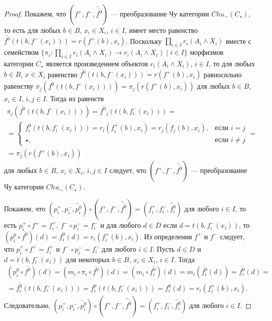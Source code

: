 \documentclass[a4paper,12pt]{article}
\begin{document}
\begin{proof}
    Покажем, что $(f^+,f^-,\widetilde{\overline{f^0}})$ --- преобразование Чу категории $Chu_\sim(C_\star)$, то есть для любых $b \in B$, $x_i \in X_i$, $i \in I$, имеет место равенство $\overline{f^0}(t(b,f^-(x_i))) = r(f^+(b),x_i)$. Поскольку $\prod_{i \in I} r_i(A_i \wedge X_i)$ вместе с семейством $\{\pi_i: \prod_{i \in I} r_i(A_i \wedge X_i) \to r_i(A_i \wedge X_i) \mid i \in I\}$ морфизмов категории $C_\star$ является произведением объектов $r_i(A_i \wedge X_i)$, $i \in I$, то для любых $b \in B$, $x \in X_i$ равенство $\overline{f^0}(t(b,f^-(x_i))) = r(f^+(b),x_i)$ равносильно равенству $\pi_j(\overline{f^0}(t(b,f^-(x_i)))) = \pi_j(r(f^+(b),x_i))$ для любых $b \in B$, $x_i \in I$, $i,j \in I$. Тогда из равенств
    \begin{multline*}
        \pi_j(\overline{f^0}(t(b,f^-(x_i)))) = \overline{f^0}_j(t(b,f^-_i(x_i))) =\\= 
        \begin{cases}
            f^0_i(t(b,f^-_i(x_i))) = r_i(f^+_i(b),x_i) = r_j(f_j(b),x_i),& \text{если } i = j\\
            \star,& \text{если } i \ne j
        \end{cases} =\\=
        \pi_j(r(f^+(b),x_i))
    \end{multline*}
    для любых $b \in B$, $x_i \in X_i$, $i,j \in I$ следует, что $(f^+,f^-,\widetilde{\overline{f^0}})$ --- преобразование Чу категории $Chu_\sim(C_\star)$.

    Покажем, что $(p^+_i,p^-_i,\widetilde{p^0_i}) \circ (f^+,f^-,\widetilde{\overline{f^0}}) = (f^+_i,f^-_i,\widetilde{f^0_i})$ для любого $i \in I$, то есть $p^+_i \circ f^+ = f^+_i$, $f^- \circ p^-_i = f^-_i$ и для любого $d \in D$ если $d = t(b,f^-_i(x_i))$, то $(p^0_i \circ \overline{f^0})(d) = f^0_i(d) = r_i(f^+_i(b),x_i)$. Из определения $f^+$ и $f^-$ следует, что $p^+_i \circ f^+ = f^+_i$ и $f^- \circ p^-_i = f^-_i$ для любого $i \in I$. Пусть $d \in D$ и $d = t(b,f^-_i(x_i))$ для некоторых $b \in B$, $x_i \in X_i$, $i \in I$. Тогда
    \begin{multline*}
        (p^0_i \circ \overline{f^0})(d) = (m_i \circ \pi_i \circ \overline{f^0})(d) = (m_i \circ \overline{f^0_i})(d) = m_i(\overline{f^0_i}(d)) = \overline{f^0_i}(d) =\\=
        \overline{f^0_i}(t(b,f^-_i(x_i))) = f^0_i(t(b,f^-_i(x_i))) = f^0_i(d) = r_i(f^+_i(b),x_i).
    \end{multline*}
    Следовательно, $(p^+_i,p^-_i,\widetilde{p^0_i}) \circ (f^+,
    f^-,\widetilde{\overline{f^0}}) = (f^+_i,f^-_i,\widetilde{f^0_i})$ для любого $i \in I$.


\end{proof}
\end{document}
